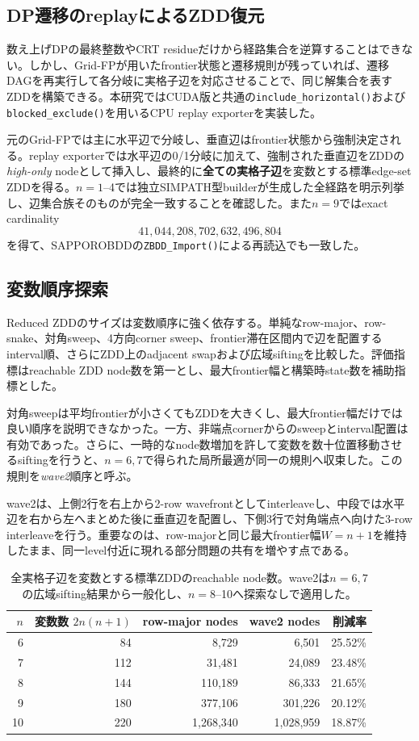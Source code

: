 \documentclass[a4paper,10pt,twocolumn]{ltjsarticle}
\newcommand{\code}[1]{\texttt{#1}}
\begin{document}
\subsection{DP遷移のreplayによるZDD復元}
数え上げDPの最終整数やCRT residueだけから経路集合を逆算することはできない。しかし、Grid-FPが用いたfrontier状態と遷移規則が残っていれば、遷移DAGを再実行して各分岐に実格子辺を対応させることで、同じ解集合を表すZDDを構築できる。本研究ではCUDA版と共通の\code{include\_horizontal()}および\code{blocked\_exclude()}を用いるCPU replay exporterを実装した。

元のGrid-FPでは主に水平辺で分岐し、垂直辺はfrontier状態から強制決定される。replay exporterでは水平辺の0/1分岐に加えて、強制された垂直辺をZDDの\emph{high-only} nodeとして挿入し、最終的に\textbf{全ての実格子辺}を変数とする標準edge-set ZDDを得る。$n=1$--4では独立SIMPATH型builderが生成した全経路を明示列挙し、辺集合族そのものが完全一致することを確認した。また$n=9$ではexact cardinality
\[
41{,}044{,}208{,}702{,}632{,}496{,}804
\]
を得て、SAPPOROBDDの\code{ZBDD\_Import()}による再読込でも一致した。

\subsection{変数順序探索}
Reduced ZDDのサイズは変数順序に強く依存する。単純なrow-major、row-snake、対角sweep、4方向corner sweep、frontier滞在区間内で辺を配置するinterval順、さらにZDD上のadjacent swapおよび広域siftingを比較した。評価指標はreachable ZDD node数を第一とし、最大frontier幅と構築時state数を補助指標とした。

対角sweepは平均frontierが小さくてもZDDを大きくし、最大frontier幅だけでは良い順序を説明できなかった。一方、非端点cornerからのsweepとinterval配置は有効であった。さらに、一時的なnode数増加を許して変数を数十位置移動させるsiftingを行うと、$n=6,7$で得られた局所最適が同一の規則へ収束した。この規則を\emph{wave2}順序と呼ぶ。

wave2は、上側2行を右上から2-row wavefrontとしてinterleaveし、中段では水平辺を右から左へまとめた後に垂直辺を配置し、下側3行で対角端点へ向けた3-row interleaveを行う。重要なのは、row-majorと同じ最大frontier幅$W=n+1$を維持したまま、同一level付近に現れる部分問題の共有を増やす点である。

\begin{table}[t]
\centering
\caption{全実格子辺を変数とする標準ZDDのreachable node数。wave2は$n=6,7$の広域sifting結果から一般化し、$n=8$--10へ探索なしで適用した。}
\label{tab:zdd-wave2}
\begin{tabular}{rrrrr}
\toprule
$n$ & 変数数 $2n(n+1)$ & row-major nodes & wave2 nodes & 削減率\\
\midrule
6  & 84  & 8,729     & 6,501     & 25.52\%\\
7  & 112 & 31,481    & 24,089    & 23.48\%\\
8  & 144 & 110,189   & 86,333    & 21.65\%\\
9  & 180 & 377,106   & 301,226   & 20.12\%\\
10 & 220 & 1,268,340 & 1,028,959 & 18.87\%\\
\bottomrule
\end{tabular}
\end{table}
\end{document}
